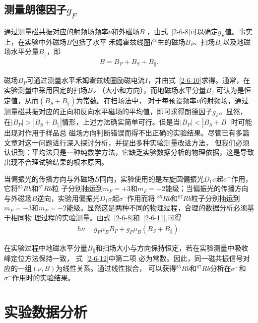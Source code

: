 \documentclass[11pt,a4paper]{article}
\begin{document}
\begin{spacing}{1.3}
\begin{CJK*}{UTF8}{gbsn}
\subsection{测量朗德因子$g_F$}
通过测量磁共振对应的射频场频率$\nu$和外磁场$B$ ，由式~\eqref{2-6-8}可以确定$g_F$值。事实上，在实验中外磁场$B$包括了水平
禾姆霍兹线圈产生的磁场$B_P$、扫场$B_s$以及地磁场水平分量$B_{\parallel}$，即
\begin{eqnarray} \label{2-6-11}
B=B_P+B_S+B_{\parallel}.
\end{eqnarray}
\par
磁场$B_P$可通过测量水平禾姆霍兹线圈励磁电流$I$，并由式~\eqref{2-6-10}求得。通常，在实验测量中采用固定的扫场$B_S$
（大小和方向），而地磁场水平分量$B_{\parallel}$ 可认为是恒定值，从而$(B_S+B_{\parallel})$为常数。在扫场法中，
对于每预设频率$\nu$的射频场，通过测量磁共振对应的正向和反向水平磁场的平均值，即可求得朗德因子$g_F$。显然，
在$|B_P|>|B_S+B_{\parallel}|$情形，上述方法确实简单可行。但是当$|B_P|<|B_S+B_{\parallel}|$时可能出现对作用于样品总
磁场方向判断错误而得不出正确的实验结果。尽管已有多篇文章对这一问题进行深入探讨分析，并提出多种实验测量改进方法，
但我们必须认识到：平均法只是一种纯数学方法，它缺乏实验数据分析的物理依据，这是导致出现不合理试验结果的根本原因。\par
当偏振光的传播方向与外磁场$B$同向，实验使用的是左旋圆偏振光$D_1\sigma$起$\sigma^+$作用，它将$^{85}Rb$和$^{87}Rb$粒
子分别抽运到$m_F=+3$和$m_F=+2$能级；当偏振光的传播方向与外磁场$B$逆向，实验用偏振光$D_1\sigma$起$\sigma^-$作用而将
$^{85}Rb$和$^{87}Rb$粒子分别抽运到$m_F=-3$和$m_F=-2$能级。显然这是两种不同的物理过程，合理的数据分析必须基于相同物
理过程的实验测量。由式~\eqref{2-6-8}和~\eqref{2-6-11},可得
\begin{eqnarray} \label{2-6-12}
h\nu=g_F\mu_BB_P+g_F\mu_B(B_S+B_{\parallel}).
\end{eqnarray}
\par
在实验过程中地磁水平分量$B_{\parallel}$和扫场大小与方向保持恒定，若在实验测量中吸收峰定位方法保持一致，
式~\eqref{2-6-12}中第二项 必为常数。因此，同一磁共振信号对应的一组$(\nu,B)$为线性关系。通过线性拟合，
可以获得$^{85}Rb$和$^{87}Rb$分析在$\sigma^+$和$\sigma^-$作用时的实验结果。

\section{实验数据分析}



\end{CJK*}
\end{spacing}
\end{document}
